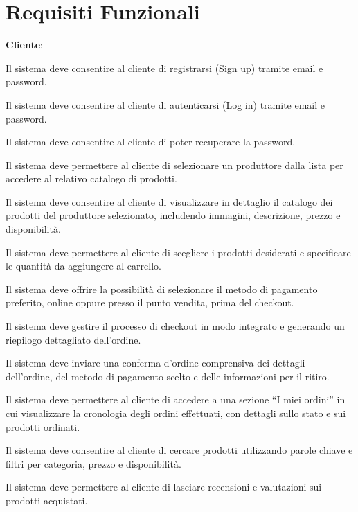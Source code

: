 \newpage
\section{Requisiti Funzionali}

\begin{rfenum}
    \item \textbf{Cliente}:
        \begin{rfenum}
            \item Il sistema deve consentire al cliente di registrarsi (Sign up) tramite email e password.
            \item Il sistema deve consentire al cliente di autenticarsi (Log in) tramite email e password.
            \item Il sistema deve consentire al cliente di poter recuperare la password.
            \item Il sistema deve permettere al cliente di selezionare un produttore dalla lista per accedere al relativo catalogo di prodotti.
            \item Il sistema deve consentire al cliente di visualizzare in dettaglio il catalogo dei prodotti del produttore selezionato, includendo immagini, descrizione, prezzo e disponibilità.
            \item Il sistema deve permettere al cliente di scegliere i prodotti desiderati e specificare le quantità da aggiungere al carrello.          
            \item Il sistema deve offrire la possibilità di selezionare il metodo di pagamento preferito, online oppure presso il punto vendita, prima del checkout.
            \item Il sistema deve gestire il processo di checkout in modo integrato e generando un riepilogo dettagliato dell'ordine.
            \item Il sistema deve inviare una conferma d'ordine comprensiva dei dettagli dell'ordine, del metodo di pagamento scelto e delle informazioni per il ritiro.
            \item Il sistema deve permettere al cliente di accedere a una sezione “I miei ordini” in cui visualizzare la cronologia degli ordini effettuati, con dettagli sullo stato e sui prodotti ordinati.
            \item Il sistema deve consentire al cliente di cercare prodotti utilizzando parole chiave e filtri per categoria, prezzo e disponibilità.
            \item Il sistema deve permettere al cliente di lasciare recensioni e valutazioni sui prodotti acquistati.


\end{rfenum}
\end{rfenum}
